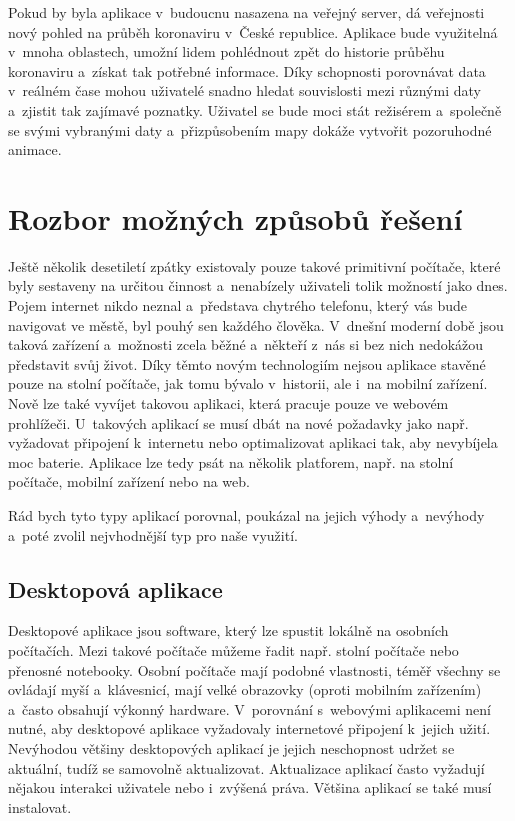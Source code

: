 Pokud by byla aplikace v~budoucnu nasazena na veřejný server, dá veřejnosti nový pohled na průběh koronaviru v~České republice. Aplikace bude využitelná v~mnoha oblastech, umožní lidem pohlédnout zpět do historie průběhu koronaviru a~získat tak potřebné informace. Díky schopnosti porovnávat data v~reálném čase mohou uživatelé snadno hledat souvislosti mezi různými daty a~zjistit tak zajímavé poznatky. Uživatel se bude moci stát režisérem a~společně se svými vybranými daty a~přizpůsobením mapy dokáže vytvořit pozoruhodné animace. 

\section{Rozbor možných způsobů řešení}
Ještě několik desetiletí zpátky existovaly pouze takové primitivní počítače, které byly sestaveny na určitou činnost a~nenabízely uživateli tolik možností jako dnes. Pojem internet nikdo neznal a~představa chytrého telefonu, který vás bude navigovat ve městě, byl pouhý sen každého člověka. V~dnešní moderní době jsou taková zařízení a~možnosti zcela běžné a~někteří z~nás si bez nich nedokážou představit svůj život. Díky těmto novým technologiím nejsou aplikace stavěné pouze na stolní počítače, jak tomu bývalo v~historii, ale i~na mobilní zařízení. Nově lze také vyvíjet takovou aplikaci, která pracuje pouze ve webovém prohlížeči. U~takových aplikací se musí dbát na nové požadavky jako např. vyžadovat připojení k~internetu nebo optimalizovat aplikaci tak, aby nevybíjela moc baterie. Aplikace lze tedy psát na několik platforem, např. na stolní počítače, mobilní zařízení nebo na web.

Rád bych tyto typy aplikací porovnal, poukázal na jejich výhody a~nevýhody a~poté zvolil nejvhodnější typ pro naše využití.

\subsection{Desktopová aplikace}
Desktopové aplikace jsou software, který lze spustit lokálně na osobních počítačích. Mezi takové počítače můžeme řadit např. stolní počítače nebo přenosné notebooky. Osobní počítače mají podobné vlastnosti, téměř všechny se ovládají myší a~klávesnicí, mají velké obrazovky (oproti mobilním zařízením) a~často obsahují výkonný hardware. V~porovnání s~webovými aplikacemi není nutné, aby desktopové aplikace vyžadovaly internetové připojení k~jejich užití. Nevýhodou většiny desktopových aplikací je jejich neschopnost udržet se aktuální, tudíž se samovolně aktualizovat. Aktualizace aplikací často vyžadují nějakou interakci uživatele nebo i~zvýšená práva. Většina aplikací se také musí instalovat.

